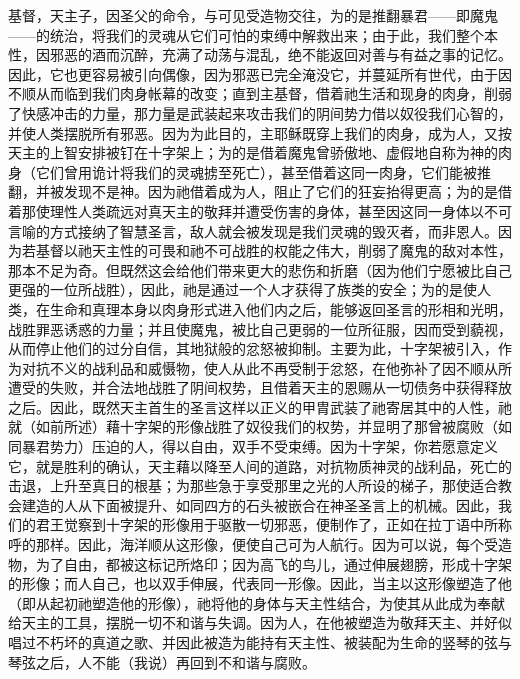基督，天主子，因圣父的命令，与可见受造物交往，为的是推翻暴君——即魔鬼——的统治，将我们的灵魂从它们可怕的束缚中解救出来；由于此，我们整个本性，因邪恶的酒而沉醉，充满了动荡与混乱，绝不能返回对善与有益之事的记忆。因此，它也更容易被引向偶像，因为邪恶已完全淹没它，并蔓延所有世代，由于因不顺从而临到我们肉身帐幕的改变；直到主基督，借着祂生活和现身的肉身，削弱了快感冲击的力量，那力量是武装起来攻击我们的阴间势力借以奴役我们心智的，并使人类摆脱所有邪恶。因为为此目的，主耶稣既穿上我们的肉身，成为人，又按天主的上智安排被钉在十字架上；为的是借着魔鬼曾骄傲地、虚假地自称为神的肉身（它们曾用诡计将我们的灵魂掳至死亡），甚至借着这同一肉身，它们能被推翻，并被发现不是神。因为祂借着成为人，阻止了它们的狂妄抬得更高；为的是借着那使理性人类疏远对真天主的敬拜并遭受伤害的身体，甚至因这同一身体以不可言喻的方式接纳了智慧圣言，敌人就会被发现是我们灵魂的毁灭者，而非恩人。因为若基督以祂天主性的可畏和祂不可战胜的权能之伟大，削弱了魔鬼的敌对本性，那本不足为奇。但既然这会给他们带来更大的悲伤和折磨（因为他们宁愿被比自己更强的一位所战胜），因此，祂是通过一个人才获得了族类的安全；为的是使人类，在生命和真理本身以肉身形式进入他们内之后，能够返回圣言的形相和光明，战胜罪恶诱惑的力量；并且使魔鬼，被比自己更弱的一位所征服，因而受到藐视，从而停止他们的过分自信，其地狱般的忿怒被抑制。主要为此，十字架被引入，作为对抗不义的战利品和威慑物，使人从此不再受制于忿怒，在他弥补了因不顺从所遭受的失败，并合法地战胜了阴间权势，且借着天主的恩赐从一切债务中获得释放之后。因此，既然天主首生的圣言这样以正义的甲胄武装了祂寄居其中的人性，祂就（如前所述）藉十字架的形像战胜了奴役我们的权势，并显明了那曾被腐败（如同暴君势力）压迫的人，得以自由，双手不受束缚。因为十字架，你若愿意定义它，就是胜利的确认，天主藉以降至人间的道路，对抗物质神灵的战利品，死亡的击退，上升至真日的根基；为那些急于享受那里之光的人所设的梯子，那使适合教会建造的人从下面被提升、如同四方的石头被嵌合在神圣圣言上的机械。因此，我们的君王觉察到十字架的形像用于驱散一切邪恶，便制作了，正如在拉丁语中所称呼的那样。因此，海洋顺从这形像，便使自己可为人航行。因为可以说，每个受造物，为了自由，都被这标记所烙印；因为高飞的鸟儿，通过伸展翅膀，形成十字架的形像；而人自己，也以双手伸展，代表同一形像。因此，当主以这形像塑造了他（即从起初祂塑造他的形像），祂将他的身体与天主性结合，为使其从此成为奉献给天主的工具，摆脱一切不和谐与失调。因为人，在他被塑造为敬拜天主、并好似唱过不朽坏的真道之歌、并因此被造为能持有天主性、被装配为生命的竖琴的弦与琴弦之后，人不能（我说）再回到不和谐与腐败。\par


